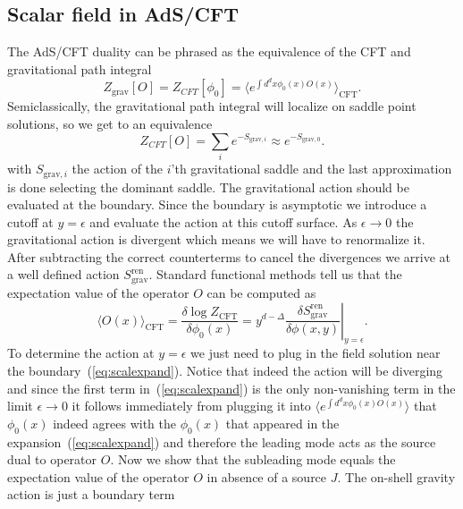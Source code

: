 \documentclass{PoS}
\newcommand{\LT}{\left[}
\newcommand{\RT}{\right]}
\begin{document}
\begin{appendix}


\section{Scalar field in AdS/CFT}
\label{sec:app0}
The AdS/CFT duality can be phrased as the equivalence of the CFT and gravitational path integral
\begin{equation}
Z_{\text{grav}}\LT O\RT = Z_{CFT} \LT \phi_0\RT= \langle e^{\int\limits d^d x \phi_0(x) O(x)}\rangle_{\text{CFT}}.
\end{equation} 
Semiclassically, the gravitational path integral will localize on saddle point solutions, so we get to an equivalence
\begin{equation}
Z_{CFT}\LT O\RT = \sum\limits_{i} e^{-S_{\text{grav},i}}\approx e^{-S_{\text{grav},0}}.
\end{equation} 
with $S_{\text{grav},i}$ the action of the $i$'th gravitational saddle and the last approximation is done selecting the dominant saddle. The gravitational action should be evaluated at the boundary. Since the boundary is asymptotic we introduce a cutoff at $y=\epsilon$ and evaluate the action at this cutoff surface. As $\epsilon\rightarrow 0$ the gravitational action is divergent which means we will have to renormalize it. After subtracting the correct counterterms to cancel the divergences we arrive at a well defined action $S^{\text{ren}}_{\text{grav}}$. Standard functional methods tell us that the expectation value of the operator $O$ can be computed as
\begin{equation}
\langle O(x) \rangle_{\text{CFT}} = \frac{ \delta \log Z_{\text{CFT}}}{\delta \phi_0(x)} = \left. y^{d-\Delta}\frac{\delta S^{\text{ren}}_{\text{grav}}}{\delta \phi(x,y)}\right|_{y=\epsilon}.
\label{eq:OExpect}
\end{equation}
To determine the action at $y=\epsilon$ we just need to plug in the field solution near the boundary~(\ref{eq:scalexpand}). Notice that indeed the action will be diverging and since the first term in~(\ref{eq:scalexpand}) is the only non-vanishing term in the limit $\epsilon\rightarrow 0$ it follows immediately from plugging it into $\langle e^{\int d^d x \phi_0(x) O(x)}\rangle$ that $\phi_0(x)$ indeed agrees with the $\phi_0(x)$ that appeared in the expansion~(\ref{eq:scalexpand}) and therefore the leading mode acts as the source dual to operator $O$. Now we show that the subleading mode equals the expectation value of the operator $O$ in absence of a source $J$. The on-shell gravity action is just a boundary term

\end{appendix}
\end{document}
